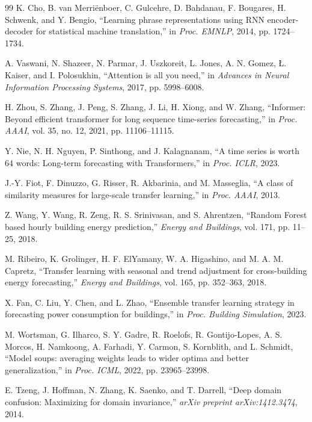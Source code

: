 \documentclass[12pt,a4paper]{report}
\begin{document}
\begin{thebibliography}{99}
K. Cho, B. van Merriënboer, C. Gulcehre, D. Bahdanau, F. Bougares, H. Schwenk, and Y. Bengio, ``Learning phrase representations using RNN encoder-decoder for statistical machine translation,'' in \textit{Proc. EMNLP}, 2014, pp. 1724--1734.

A. Vaswani, N. Shazeer, N. Parmar, J. Uszkoreit, L. Jones, A. N. Gomez, Ł. Kaiser, and I. Polosukhin, ``Attention is all you need,'' in \textit{Advances in Neural Information Processing Systems}, 2017, pp. 5998--6008.

H. Zhou, S. Zhang, J. Peng, S. Zhang, J. Li, H. Xiong, and W. Zhang, ``Informer: Beyond efficient transformer for long sequence time-series forecasting,'' in \textit{Proc. AAAI}, vol. 35, no. 12, 2021, pp. 11106--11115.

Y. Nie, N. H. Nguyen, P. Sinthong, and J. Kalagnanam, ``A time series is worth 64 words: Long-term forecasting with Transformers,'' in \textit{Proc. ICLR}, 2023.

J.-Y. Fiot, F. Dinuzzo, G. Risser, R. Akbarinia, and M. Masseglia, ``A class of similarity measures for large-scale transfer learning,'' in \textit{Proc. AAAI}, 2013.

Z. Wang, Y. Wang, R. Zeng, R. S. Srinivasan, and S. Ahrentzen, ``Random Forest based hourly building energy prediction,'' \textit{Energy and Buildings}, vol. 171, pp. 11--25, 2018.

M. Ribeiro, K. Grolinger, H. F. ElYamany, W. A. Higashino, and M. A. M. Capretz, ``Transfer learning with seasonal and trend adjustment for cross-building energy forecasting,'' \textit{Energy and Buildings}, vol. 165, pp. 352--363, 2018.

X. Fan, C. Liu, Y. Chen, and L. Zhao, ``Ensemble transfer learning strategy in forecasting power consumption for buildings,'' in \textit{Proc. Building Simulation}, 2023.

M. Wortsman, G. Ilharco, S. Y. Gadre, R. Roelofs, R. Gontijo-Lopes, A. S. Morcos, H. Namkoong, A. Farhadi, Y. Carmon, S. Kornblith, and L. Schmidt, ``Model soups: averaging weights leads to wider optima and better generalization,'' in \textit{Proc. ICML}, 2022, pp. 23965--23998.

E. Tzeng, J. Hoffman, N. Zhang, K. Saenko, and T. Darrell, ``Deep domain confusion: Maximizing for domain invariance,'' \textit{arXiv preprint arXiv:1412.3474}, 2014.


\end{thebibliography}
\end{document}
